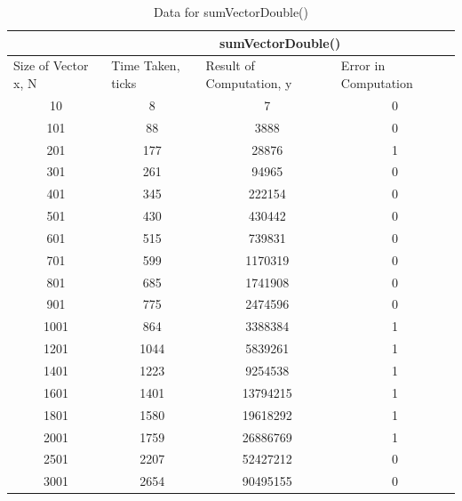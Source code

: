 \documentclass{article}
\begin{document}
\begin{table}[h!]
\centering
\begin{tabular}{c|c|c|c|}
\cline{2-4}
 & \multicolumn{3}{c|}{sumVectorDouble()} \\ \hline
\multicolumn{1}{|l|}{Size of Vector x, N} & \multicolumn{1}{l|}{Time Taken, ticks} & \multicolumn{1}{l|}{Result of Computation, y} & \multicolumn{1}{l|}{Error in Computation} \\ \hline
\multicolumn{1}{|c|}{10} & 8 & 7 & 0 \\ \hline
\multicolumn{1}{|c|}{101} & 88 & 3888 & 0 \\ \hline
\multicolumn{1}{|c|}{201} & 177 & 28876 & 1 \\ \hline
\multicolumn{1}{|c|}{301} & 261 & 94965 & 0 \\ \hline
\multicolumn{1}{|c|}{401} & 345 & 222154 & 0 \\ \hline
\multicolumn{1}{|c|}{501} & 430 & 430442 & 0 \\ \hline
\multicolumn{1}{|c|}{601} & 515 & 739831 & 0 \\ \hline
\multicolumn{1}{|c|}{701} & 599 & 1170319 & 0 \\ \hline
\multicolumn{1}{|c|}{801} & 685 & 1741908 & 0 \\ \hline
\multicolumn{1}{|c|}{901} & 775 & 2474596 & 0 \\ \hline
\multicolumn{1}{|c|}{1001} & 864 & 3388384 & 1 \\ \hline
\multicolumn{1}{|c|}{1201} & 1044 & 5839261 & 1 \\ \hline
\multicolumn{1}{|c|}{1401} & 1223 & 9254538 & 1 \\ \hline
\multicolumn{1}{|c|}{1601} & 1401 & 13794215 & 1 \\ \hline
\multicolumn{1}{|c|}{1801} & 1580 & 19618292 & 1 \\ \hline
\multicolumn{1}{|c|}{2001} & 1759 & 26886769 & 1 \\ \hline
\multicolumn{1}{|c|}{2501} & 2207 & 52427212 & 0 \\ \hline
\multicolumn{1}{|c|}{3001} & 2654 & 90495155 & 0 \\ \hline
\end{tabular}
\caption{Data for sumVectorDouble()}
\end{table}
\end{document}
